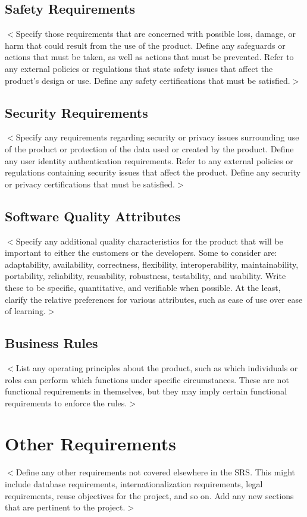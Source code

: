 \documentclass{scrreprt}
\begin{document}
\begin{CJK}{UTF8}{bkai}
\section{Safety Requirements}
$<$Specify those requirements that are concerned with possible loss, damage, or 
harm that could result from the use of the product. Define any safeguards or 
actions that must be taken, as well as actions that must be prevented. Refer to 
any external policies or regulations that state safety issues that affect the 
product’s design or use. Define any safety certifications that must be 
satisfied.$>$

\section{Security Requirements}
$<$Specify any requirements regarding security or privacy issues surrounding use 
of the product or protection of the data used or created by the product. Define 
any user identity authentication requirements. Refer to any external policies or 
regulations containing security issues that affect the product. Define any 
security or privacy certifications that must be satisfied.$>$

\section{Software Quality Attributes}
$<$Specify any additional quality characteristics for the product that will be 
important to either the customers or the developers. Some to consider are: 
adaptability, availability, correctness, flexibility, interoperability, 
maintainability, portability, reliability, reusability, robustness, testability, 
and usability. Write these to be specific, quantitative, and verifiable when 
possible. At the least, clarify the relative preferences for various attributes, 
such as ease of use over ease of learning.$>$

\section{Business Rules}
$<$List any operating principles about the product, such as which individuals or 
roles can perform which functions under specific circumstances. These are not 
functional requirements in themselves, but they may imply certain functional 
requirements to enforce the rules.$>$


\chapter{Other Requirements}
$<$Define any other requirements not covered elsewhere in the SRS. This might 
include database requirements, internationalization requirements, legal 
requirements, reuse objectives for the project, and so on. Add any new sections 
that are pertinent to the project.$>$


\end{CJK}
\end{document}

